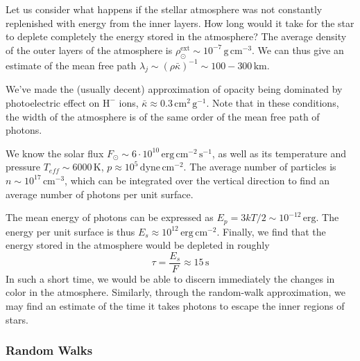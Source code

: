 Let us consider what happens if the stellar atmosphere was not constantly replenished with energy from the inner layers. How long would it take for the star to deplete completely the energy stored in the atmosphere? The average density of the outer layers of the atmosphere is $\rho^{\text{ext}}_{\odot}\sim 10^{-7}\,\text{g}\,\text{cm}^{-3}$. We can thus give an estimate of the mean free path $\lambda_{j}\sim (\rho\bar{\kappa})^{-1}\sim 100-300\,\text{km}$.
\par We've made the (usually decent) approximation of opacity being dominated by photoelectric effect on $\text{H}^{-}$ ions, $\bar{\kappa} \approx 0.3\,\text{cm}^{2}\,\text{g}^{-1}$. Note that in these conditions, the width of the atmosphere is of the same order of the mean free path of photons.
\par We know the solar flux $F_{\odot} \sim 6 \cdot 10^{10}\,\text{erg}\,\text{cm}^{-2}\,\text{s}^{-1}$, as well as its temperature and pressure $T_{eff}\sim 6000\,\text{K}$, $p\approx 10^{5}\,\text{dyne}\,\text{cm}^{-2}$. The average number of particles is $n\sim 10^{17}\,\text{cm}^{-3}$, which can be integrated over the vertical direction to find an average number of photons per unit surface.
\par The mean energy of photons can be expressed as $E_{p} = 3kT/2\sim 10^{-12}\,\text{erg}$. The energy per unit surface is thus $E_{s}\approx 10^{12}\,\text{erg}\,\text{cm}^{-2}$. Finally, we find that the energy stored in the atmosphere would be depleted in roughly
\begin{equation*}
	\tau = \frac{E_{s}}{F} \approx 15\,\text{s}
\end{equation*}
In such a short time, we would be able to discern immediately the changes in color in the atmosphere. Similarly, through the random-walk approximation, we may find an estimate of the time it takes photons to escape the inner regions of stars.

\subsubsection*{Random Walks}

